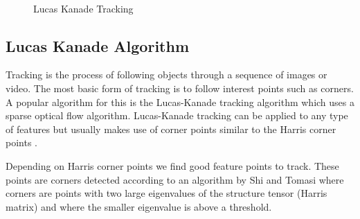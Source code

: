 \begin{figure}[h]
\begin{dBox}
\centering
  \mbox{
   }
   \caption{Lucas Kanade Tracking\label{fig:dynamic91011} }   
\end{dBox}   
\end{figure}

\subsection{Lucas Kanade Algorithm }
Tracking is the process of following objects through a sequence of images or video. The most basic form of tracking is to follow interest points such as corners. A popular algorithm for this is the Lucas-Kanade tracking algorithm \cite{dynamic3} which uses a sparse optical flow algorithm. Lucas-Kanade tracking can be applied to any type of features but usually makes use of corner points similar to the Harris corner points \cite{dynamic4} .\bigskip

Depending on Harris corner points we find good feature points to track. These points are corners detected according to an algorithm by Shi and Tomasi \cite{dynamic5}  where corners are points with two large eigenvalues of the structure tensor (Harris matrix) and where the smaller eigenvalue is above a threshold.\bigskip

